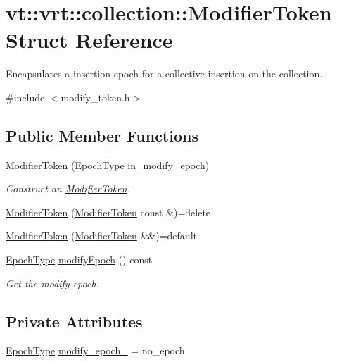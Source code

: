 \hypertarget{structvt_1_1vrt_1_1collection_1_1_modifier_token}{}\section{vt\+:\+:vrt\+:\+:collection\+:\+:Modifier\+Token Struct Reference}
\label{structvt_1_1vrt_1_1collection_1_1_modifier_token}


Encapsulates a insertion epoch for a collective insertion on the collection.  




{\ttfamily \#include $<$modify\+\_\+token.\+h$>$}

\subsection*{Public Member Functions}
\begin{DoxyCompactItemize}
\item 
\hyperlink{structvt_1_1vrt_1_1collection_1_1_modifier_token_a6c0d5fed4a1575396c0e2f6656cffd75}{Modifier\+Token} (\hyperlink{namespacevt_a985a5adf291c34a3ca263b3378388236}{Epoch\+Type} in\+\_\+modify\+\_\+epoch)
\begin{DoxyCompactList}\small\item\em Construct an {\ttfamily \hyperlink{structvt_1_1vrt_1_1collection_1_1_modifier_token}{Modifier\+Token}}. \end{DoxyCompactList}\item 
\hyperlink{structvt_1_1vrt_1_1collection_1_1_modifier_token_a4aa2f4483c7361fb217299825fc58824}{Modifier\+Token} (\hyperlink{structvt_1_1vrt_1_1collection_1_1_modifier_token}{Modifier\+Token} const \&)=delete
\item 
\hyperlink{structvt_1_1vrt_1_1collection_1_1_modifier_token_ae2a023008729629db146e05715e76b50}{Modifier\+Token} (\hyperlink{structvt_1_1vrt_1_1collection_1_1_modifier_token}{Modifier\+Token} \&\&)=default
\item 
\hyperlink{namespacevt_a985a5adf291c34a3ca263b3378388236}{Epoch\+Type} \hyperlink{structvt_1_1vrt_1_1collection_1_1_modifier_token_a2a87237f09095f3284a5ebea7b9976e9}{modify\+Epoch} () const
\begin{DoxyCompactList}\small\item\em Get the modify epoch. \end{DoxyCompactList}\end{DoxyCompactItemize}
\subsection*{Private Attributes}
\begin{DoxyCompactItemize}
\item 
\hyperlink{namespacevt_a985a5adf291c34a3ca263b3378388236}{Epoch\+Type} \hyperlink{structvt_1_1vrt_1_1collection_1_1_modifier_token_a3c0115cdf4a5097aa9ff940b0e8c9172}{modify\+\_\+epoch\+\_\+} = no\+\_\+epoch
\end{DoxyCompactItemize}


